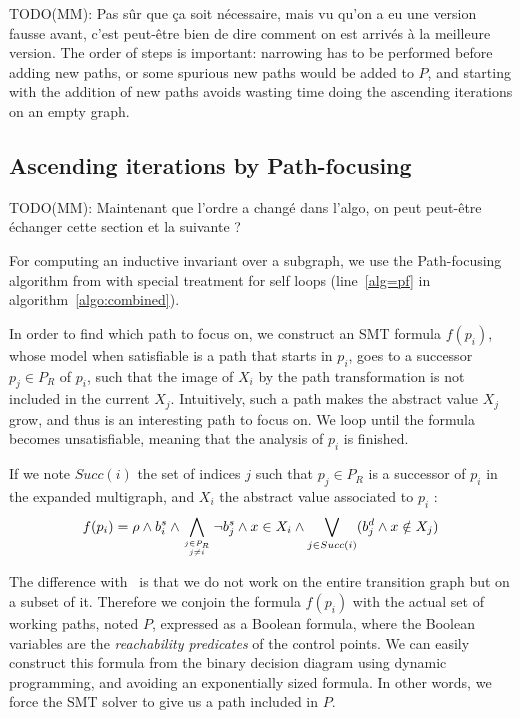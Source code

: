 \documentclass[preprint]{sigplanconf}
\newcommand{\MM}[1]{{\color{blue} TODO(MM): #1}}
\begin{document}
\MM{Pas sûr que ça soit nécessaire, mais vu qu'on a eu une version
  fausse avant, c'est peut-être bien de dire comment on est arrivés à
  la meilleure version.}
The order of steps is important: narrowing has to be performed before
adding new paths, or some spurious new paths would be added to $P$,
and starting with the addition of new paths avoids wasting time
doing the ascending iterations on an empty graph.

\subsection{Ascending iterations by Path-focusing}
\label{subsec:ascending}

\MM{Maintenant que l'ordre a changé dans l'algo, on peut peut-être
  échanger cette section et la suivante ?}

For computing an inductive invariant over a subgraph, we use the
Path-focusing algorithm from \citet{Monniaux_Gonnord_SAS11} with special
treatment for self loops (line~\ref{alg=pf} in algorithm~\ref{algo:combined}).

In order to find which path to focus on, we construct an SMT formula $f(p_i)$, whose
model when satisfiable is a path that starts in $p_i$, goes to a successor $p_j
\in P_R$ of $p_i$, such that the image of $X_{i}$ by the path transformation
is not included in the current $X_{j}$.
Intuitively, such a path makes the abstract value $X_{j}$ grow, and thus is
an interesting path to focus on. We loop until the formula becomes unsatisfiable,
meaning that the analysis of $p_i$ is finished.

If we note $Succ(i)$ the set of indices $j$ such that $p_j \in P_R$ is a
successor of $p_i$ in the expanded multigraph, and $X_i$ the abstract value
associated to $p_i$ :
$$f(p_i) = \rho \wedge b_i^s \wedge 
\displaystyle\bigwedge_{j \in P_R \atop j \neq i} \neg
b_j^s \wedge x \in X_i \wedge \displaystyle\bigvee_{j \in Succ(i)} (b_j^d \wedge
x \notin X_j)$$

The difference with~\citet{Monniaux_Gonnord_SAS11} is that we do not
work on the entire transition graph but on a subset of it. Therefore we
conjoin the formula $f(p_i)$ with the actual set of working paths,
noted $P$, expressed as a Boolean formula, where the Boolean variables are the
\emph{reachability predicates} of the control points. We can easily construct
this formula from the binary decision diagram using dynamic programming, and
avoiding an exponentially sized formula. In other words, we force the SMT solver
to give us a path included in $P$.
\end{document}
